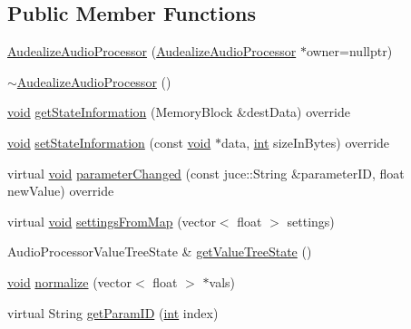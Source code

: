 \subsection*{Public Member Functions}
\begin{DoxyCompactItemize}
\item 
\hyperlink{class_audealize_1_1_audealize_audio_processor_a43c50db2160af612bed07847c5799ebe}{Audealize\+Audio\+Processor} (\hyperlink{class_audealize_1_1_audealize_audio_processor}{Audealize\+Audio\+Processor} $\ast$owner=nullptr)
\item 
\hyperlink{class_audealize_1_1_audealize_audio_processor_a7ba6f1b2676b471be401206abc0a08cf}{$\sim$\+Audealize\+Audio\+Processor} ()
\item 
\hyperlink{tk_8h_aba408b7cd755a96426e004c015f5de8e}{void} \hyperlink{class_audealize_1_1_audealize_audio_processor_a23a944b8047d7854728758c0261438ee}{get\+State\+Information} (Memory\+Block \&dest\+Data) override
\item 
\hyperlink{tk_8h_aba408b7cd755a96426e004c015f5de8e}{void} \hyperlink{class_audealize_1_1_audealize_audio_processor_aae3c8f976075ac1f095b4ac71bf91764}{set\+State\+Information} (const \hyperlink{tk_8h_aba408b7cd755a96426e004c015f5de8e}{void} $\ast$data, \hyperlink{tk_8h_a83f82f76e7fed06f4c49d2db94028a6d}{int} size\+In\+Bytes) override
\item 
virtual \hyperlink{tk_8h_aba408b7cd755a96426e004c015f5de8e}{void} \hyperlink{class_audealize_1_1_audealize_audio_processor_a4832111ea2b24bc517f911fa5949ca56}{parameter\+Changed} (const juce\+::\+String \&parameter\+ID, float new\+Value) override
\item 
virtual \hyperlink{tk_8h_aba408b7cd755a96426e004c015f5de8e}{void} \hyperlink{class_audealize_1_1_audealize_audio_processor_af269ce5549d8474f11f26c41aefa51bc}{settings\+From\+Map} (vector$<$ float $>$ settings)
\item 
Audio\+Processor\+Value\+Tree\+State \& \hyperlink{class_audealize_1_1_audealize_audio_processor_ac90ee1235c7947d995ded5a3a494adfe}{get\+Value\+Tree\+State} ()
\item 
\hyperlink{tk_8h_aba408b7cd755a96426e004c015f5de8e}{void} \hyperlink{class_audealize_1_1_audealize_audio_processor_a18d5cd428aa8bac6db26abe6668a7a28}{normalize} (vector$<$ float $>$ $\ast$vals)
\item 
virtual String \hyperlink{class_audealize_1_1_audealize_audio_processor_aa3e347b4bdc34e419ccf350638c38028}{get\+Param\+ID} (\hyperlink{tk_8h_a83f82f76e7fed06f4c49d2db94028a6d}{int} index)
\item 

\end{DoxyCompactItemize}

